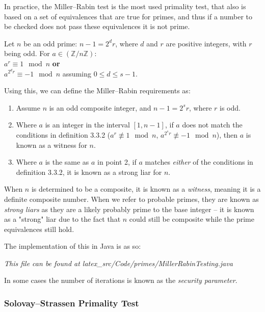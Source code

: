     In practice, the Miller--Rabin test is the most used primality test, that also is based on a set of equivalences that are true for primes, and thus if a number to be checked does not pass these equivalences it is not prime. \\
    
    \begin{mathdef}
      Let $n$ be an odd prime: $n - 1 = 2^dr$, where $d$ and $r$ are positive integers, with $r$ being odd. For $a \in (\mathbb{Z}/n\mathbb{Z})$: \\
      $a^r \equiv 1 \mod{n}$ \textbf{or} \\
      $a^{2^dr} \equiv -1 \mod{n}$ assuming $0 \leq d \leq s - 1$.
    \end{mathdef}
    
    Using this, we can define the Miller--Rabin requirements as:
    
    \begin{enumerate}
      \item Assume $n$ is an odd composite integer, and $n - 1 = 2^sr$, where $r$ is odd.
      \item Where $a$ is an integer in the interval $[1,n-1]$, if $a$ does not match the conditions in definition 3.3.2 ($a^r \not\equiv1 \mod{n}$,  $a^{2^sr} \not\equiv -1 \mod{n}$), then $a$ is known as a witness for $n$.
      \item Where $a$ is the same as $a$ in point 2, if $a$ matches \emph{either} of the conditions in definition 3.3.2, it is known as a strong liar for $n$.
    \end{enumerate}
    
    When $n$ is determined to be a composite, it is known as a \emph{witness}, meaning it is a definite composite number. When we refer to probable primes, they are known as \emph{strong liars} as they are a likely probably prime to the base integer -- it is known as a "strong" liar due to the fact that $n$ could still be composite while the prime equivalences still hold.
    
    The implementation of this in Java is as so:
    
    
    \emph{This file can be found at latex\_src/Code/primes/MillerRabinTesting.java}
    
    In some cases the number of iterations is known as the \emph{security parameter}.
    
    \subsubsection{Solovay--Strassen Primality Test}
    
